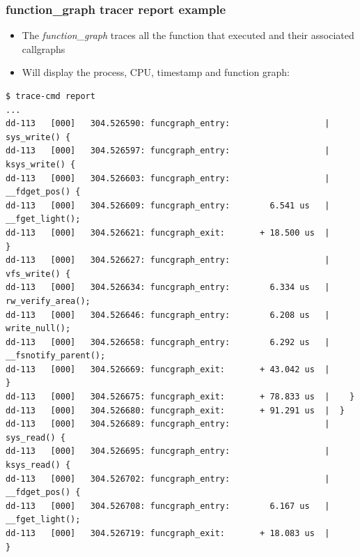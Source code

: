 \begin{frame}[fragile]
  \frametitle{function\_graph tracer report example}
  \begin{itemize}
    \item The {\em function\_graph} traces all the function that
      executed and their associated callgraphs
    \item Will display the process, CPU, timestamp and function graph:
  \end{itemize}
  \begin{block}{}
    \begin{verbatim}
$ trace-cmd report
...
dd-113   [000]   304.526590: funcgraph_entry:                   |  sys_write() {
dd-113   [000]   304.526597: funcgraph_entry:                   |    ksys_write() {
dd-113   [000]   304.526603: funcgraph_entry:                   |      __fdget_pos() {
dd-113   [000]   304.526609: funcgraph_entry:        6.541 us   |        __fget_light();
dd-113   [000]   304.526621: funcgraph_exit:       + 18.500 us  |      }
dd-113   [000]   304.526627: funcgraph_entry:                   |      vfs_write() {
dd-113   [000]   304.526634: funcgraph_entry:        6.334 us   |        rw_verify_area();
dd-113   [000]   304.526646: funcgraph_entry:        6.208 us   |        write_null();
dd-113   [000]   304.526658: funcgraph_entry:        6.292 us   |        __fsnotify_parent();
dd-113   [000]   304.526669: funcgraph_exit:       + 43.042 us  |      }
dd-113   [000]   304.526675: funcgraph_exit:       + 78.833 us  |    }
dd-113   [000]   304.526680: funcgraph_exit:       + 91.291 us  |  }
dd-113   [000]   304.526689: funcgraph_entry:                   |  sys_read() {
dd-113   [000]   304.526695: funcgraph_entry:                   |    ksys_read() {
dd-113   [000]   304.526702: funcgraph_entry:                   |      __fdget_pos() {
dd-113   [000]   304.526708: funcgraph_entry:        6.167 us   |        __fget_light();
dd-113   [000]   304.526719: funcgraph_exit:       + 18.083 us  |      }
    \end{verbatim}
  \end{block}
\end{frame}

